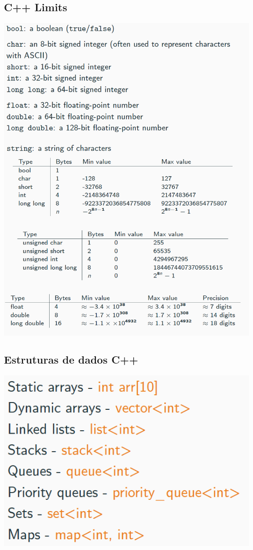 \documentclass[a4paper,12pt]{article}
\begin{document}
\subsection{C++ Limits}
\begin{center}
  \includegraphics[width=\linewidth]{figures/outros/cpp_limits.png}
\end{center}

\subsection{Estruturas de dados C++}
\begin{center}
  \includegraphics[width=\linewidth/2]{figures/outros/eds_c++.png}
\end{center}
\end{document}
